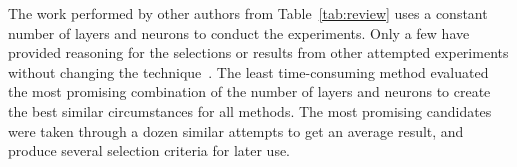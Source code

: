 %
The work performed by other authors from Table~\ref{tab:review} uses a constant number of layers and neurons to conduct the experiments.
Only a few have provided reasoning for the selections or results from other attempted experiments without changing the technique~\cite{jiao_gru-rnn_2020,mamo_long_2020}.
The least time-consuming method evaluated the most promising combination of the number of layers and neurons to create the best similar circumstances for all methods.
The most promising candidates were taken through a dozen similar attempts to get an average result, and produce several selection criteria for later use.
